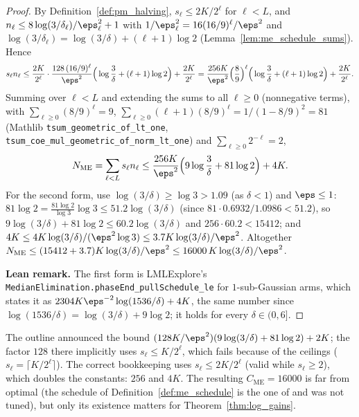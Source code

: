 \begin{proof}
\leanok
{}
By Definition~\ref{def:pm_halving}, $s_\ell\le2K/2^\ell$ for $\ell<L$, and
$n_\ell\le8\log(3/\delta_\ell)/\eps_\ell^2+1$ with $1/\eps_\ell^2 = 16(16/9)^\ell/\eps^2$ and
$\log(3/\delta_\ell) = \log(3/\delta)+(\ell+1)\log2$ (Lemma~\ref{lem:me_schedule_sums}). Hence
\[
  s_\ell n_\ell\le\frac{2K}{2^\ell}\cdot\frac{128\,(16/9)^\ell}{\eps^2}\Big(\log\frac3\delta+(\ell+1)\log2\Big)+\frac{2K}{2^\ell}
  = \frac{256K}{\eps^2}\Big(\frac89\Big)^\ell\Big(\log\frac3\delta+(\ell+1)\log2\Big)+\frac{2K}{2^\ell}.
\]
Summing over $\ell<L$ and extending the sums to all $\ell\ge0$ (nonnegative terms), with
$\sum_{\ell\ge0}(8/9)^\ell = 9$, $\sum_{\ell\ge0}(\ell+1)(8/9)^\ell = 1/(1-8/9)^2 = 81$ (Mathlib
\texttt{tsum\_geometric\_of\_lt\_one}, \texttt{tsum\_coe\_mul\_geometric\_of\_norm\_lt\_one}) and
$\sum_{\ell\ge0}2^{-\ell} = 2$,
\[
  N_{\mathrm{ME}} = \sum_{\ell<L}s_\ell n_\ell\le\frac{256K}{\eps^2}\Big(9\log\frac3\delta+81\log2\Big)+4K .
\]
For the second form, use $\log(3/\delta)\ge\log3>1.09$ (as $\delta<1$) and $\eps\le1$:
$81\log2 = \frac{81\log2}{\log3}\log3\le 51.2\log(3/\delta)$ (since $81\cdot0.6932/1.0986<51.2$),
so $9\log(3/\delta)+81\log2\le 60.2\log(3/\delta)$ and $256\cdot60.2<15412$; and
$4K\le 4K\log(3/\delta)/(\eps^2\log3)\le 3.7K\log(3/\delta)/\eps^2$. Altogether
$N_{\mathrm{ME}}\le(15412+3.7)K\log(3/\delta)/\eps^2\le16000\,K\log(3/\delta)/\eps^2$.

\textbf{Lean remark.} The first form is LMLExplore's
\texttt{MedianElimination.phaseEnd\_pullSchedule\_le} for $1$-sub-Gaussian arms, which states it
as $2304K\eps^{-2}\log(1536/\delta)+4K$, the same number since
$\log(1536/\delta) = \log(3/\delta)+9\log2$; it holds for every $\delta\in(0,6]$.
\end{proof}

\begin{remark}\label{rem:pm_budget_constants}
The outline announced the bound $(128K/\eps^2)(9\log(3/\delta)+81\log2)+2K$; the factor $128$
there implicitly uses $s_\ell\le K/2^\ell$, which fails because of the ceilings
($s_\ell = \lceil K/2^\ell\rceil$). The correct bookkeeping uses $s_\ell\le2K/2^\ell$ (valid while
$s_\ell\ge2$), which doubles the constants: $256$ and $4K$. The resulting
$C_{\mathrm{ME}} = 16000$ is far from optimal (the schedule of Definition~\ref{def:me_schedule}
is the one of \cite{even2002pac} and was not tuned), but only its existence matters for
Theorem~\ref{thm:log_gains}.
\end{remark}

